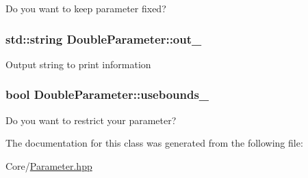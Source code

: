 Do you want to keep parameter fixed? \hypertarget{class_double_parameter_ad3c3e06213e3c1bd6290a592b0c2c021}{
\subsubsection[{out\-\_\-}]{\setlength{\rightskip}{0pt plus 5cm}std\-::string Double\-Parameter\-::out\-\_\-\hspace{0.3cm}{\ttfamily [protected]}}}\label{class_double_parameter_ad3c3e06213e3c1bd6290a592b0c2c021}
Output string to print information \hypertarget{class_double_parameter_af07ddf0264eb60d46dfef6536850e748}{
\subsubsection[{usebounds\-\_\-}]{\setlength{\rightskip}{0pt plus 5cm}bool Double\-Parameter\-::usebounds\-\_\-\hspace{0.3cm}{\ttfamily [protected]}}}\label{class_double_parameter_af07ddf0264eb60d46dfef6536850e748}
Do you want to restrict your parameter? 

The documentation for this class was generated from the following file\-:\begin{DoxyCompactItemize}
\item 
Core/\hyperlink{_parameter_8hpp}{Parameter.\-hpp}\end{DoxyCompactItemize}
